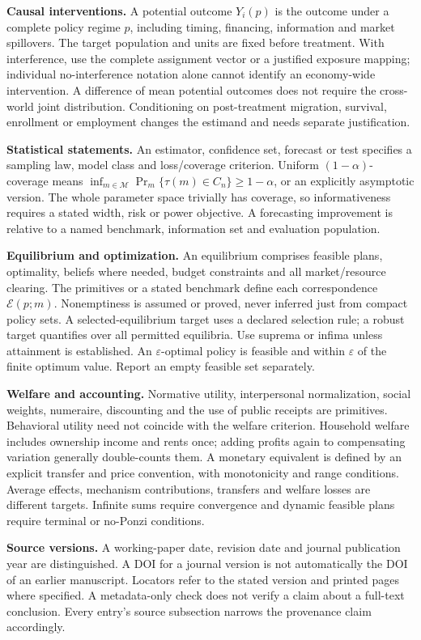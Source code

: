\documentclass[11pt,a4paper]{article}
\begin{document}
\textbf{Causal interventions.} A potential outcome \(Y_i(p)\) is the outcome under a complete policy regime \(p\), including timing, financing, information and market spillovers. The target population and units are fixed before treatment. With interference, use the complete assignment vector or a justified exposure mapping; individual no-interference notation alone cannot identify an economy-wide intervention. A difference of mean potential outcomes does not require the cross-world joint distribution. Conditioning on post-treatment migration, survival, enrollment or employment changes the estimand and needs separate justification.

\textbf{Statistical statements.} An estimator, confidence set, forecast or test specifies a sampling law, model class and loss/coverage criterion. Uniform \((1-\alpha)\)-coverage means \(\inf_{m\in\mathcal M}\Pr_m\{\tau(m)\in C_n\}\geq1-\alpha\), or an explicitly asymptotic version. The whole parameter space trivially has coverage, so informativeness requires a stated width, risk or power objective. A forecasting improvement is relative to a named benchmark, information set and evaluation population.

\textbf{Equilibrium and optimization.} An equilibrium comprises feasible plans, optimality, beliefs where needed, budget constraints and all market/resource clearing. The primitives or a stated benchmark define each correspondence \(\mathcal E(p;m)\). Nonemptiness is assumed or proved, never inferred just from compact policy sets. A selected-equilibrium target uses a declared selection rule; a robust target quantifies over all permitted equilibria. Use suprema or infima unless attainment is established. An \(\varepsilon\)-optimal policy is feasible and within \(\varepsilon\) of the finite optimum value. Report an empty feasible set separately.

\textbf{Welfare and accounting.} Normative utility, interpersonal normalization, social weights, numeraire, discounting and the use of public receipts are primitives. Behavioral utility need not coincide with the welfare criterion. Household welfare includes ownership income and rents once; adding profits again to compensating variation generally double-counts them. A monetary equivalent is defined by an explicit transfer and price convention, with monotonicity and range conditions. Average effects, mechanism contributions, transfers and welfare losses are different targets. Infinite sums require convergence and dynamic feasible plans require terminal or no-Ponzi conditions.

\textbf{Source versions.} A working-paper date, revision date and journal publication year are distinguished. A DOI for a journal version is not automatically the DOI of an earlier manuscript. Locators refer to the stated version and printed pages where specified. A metadata-only check does not verify a claim about a full-text conclusion. Every entry's source subsection narrows the provenance claim accordingly.
\end{document}
